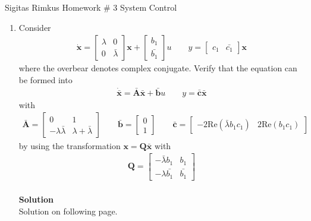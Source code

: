 \documentclass[11pt]{article}
\begin{document}
Sigitas Rimkus \hfill Homework \# 3 \hfill System Control
\begin{enumerate}

	\item{Consider
		\begin{align*}			
			\dot{\mathbf{x}} = \left[\begin{array}{cc}\lambda & 0 \\0 & \bar{\lambda}\end{array}\right]\mathbf{x} + \left[\begin{array}{c}b_1 \\\bar{b_1}\end{array}\right]u \quad \quad y = \left[\begin{array}{cc}c_1 & \bar{c_1}\end{array}\right]\mathbf{x}
		\end{align*}
	where the overbear denotes complex conjugate.  Verify that the equation can be formed into
		\begin{align*}
			\dot{\bar{\mathbf{x}}}=\bar{\mathbf{A}}\bar{\mathbf{x}}+\bar{\mathbf{b}}u \quad \quad y=\bar{\mathbf{c}}\bar{\mathbf{x}}
		\end{align*}
	with
		\begin{align*}
			\bar{\mathbf{A}}=\left[\begin{array}{cc}0 & 1 \\-\lambda \bar{\lambda} & \lambda+					\bar{\lambda}\end{array}\right] \quad \quad \bar{\mathbf{b}}=\left[\begin{array}{c}0 \\1\end{array}\right] \quad \quad \bar{\mathbf{c}}=\left[\begin{array}{cc}-2\mathrm{Re}\left(\bar{\lambda}b_1c_1\right) & 2\mathrm{Re}\left(b_1c_1\right)\end{array}\right]
		\end{align*}
	by using the transformation $\mathbf{x}=\mathbf{Q\bar{x}}$ with
		\begin{align*}
			\mathbf{Q}=\left[\begin{array}{cc}-\bar{\lambda}b_1 & b_1 \\-\lambda \bar{b_1} & \bar{b_1}\end{array}\right]
		\end{align*}
	\\
	
	\textbf{Solution}\\
	Solution on following page.
	}
	

\end{enumerate}
\end{document}
